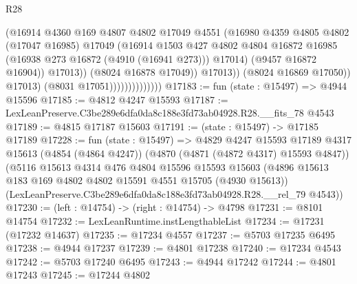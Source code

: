 \begin{lexlean}{R28}
\begin{coremodule}
                                          (@16914
                                            @4360
                                            @169
                                            @4807
                                            @4802
                                            @17049
                                            @4551
                                            (@16980
                                              @4359
                                              @4805
                                              @4802
                                              (@17047 @16985)
                                              @17049
                                              (@16914
                                                @1503
                                                @427
                                                @4802
                                                @4804
                                                @16872
                                                @16985
                                                (@16938 @273 @16872 (@4910 (@16941 @273)))
                                                @17014)
                                              (@9457 @16872 @16904))
                                            @17013))
                                        (@8024 @16878 @17049))
                                      @17013))
                                  (@8024 @16869 @17050))
                                @17013)
                              (@8031 @17051))))))))))))))
@17183 := fun (state : @15497) => @4944 @15596
@17185 := @4812 @4247 @15593
@17187 := LexLeanPreserve.C3be289e6dfa0da8c188e3fd73ab04928.R28.__fits_78 @4543
@17189 := @4815 @17187 @15603
@17191 := (state : @15497) -> @17185 @17189
@17228 := fun (state : @15497) =>
  @4829
    @4247
    @15593
    @17189
    @4317
    @15613
    (@4854 (@4864 @4247))
    (@4870 (@4871 (@4872 @4317) @15593 @4847))
    (@5116
      @15613
      @4314
      @476
      @4804
      @15596
      @15593
      @15603
      (@4896 @15613 @183 @169 @4802 @4802 @15591 @4551 @15705 (@4930 @15613))
      (LexLeanPreserve.C3be289e6dfa0da8c188e3fd73ab04928.R28.__rel_79 @4543))
@17230 := (left : @14754) -> (right : @14754) -> @4798
@17231 := @8101 @14754
@17232 := LexLeanRuntime.instLengthableList
@17234 := @17231 (@17232 @14637)
@17235 := @17234 @4557
@17237 := @5703 @17235 @6495
@17238 := @4944 @17237
@17239 := @4801 @17238
@17240 := @17234 @4543
@17242 := @5703 @17240 @6495
@17243 := @4944 @17242
@17244 := @4801 @17243
@17245 := @17244 @4802

\end{coremodule}
\end{lexlean}
